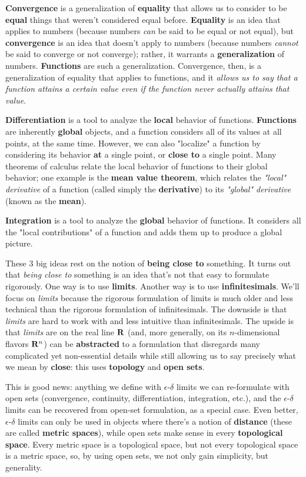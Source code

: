 {\bf Convergence} is a generalization of {\bf equality} that allows us to consider to be {\bf equal} things that weren't considered equal before. {\bf Equality} is an idea that applies to numbers (because numbers {\it can} be said to be equal or not equal), but {\bf convergence} is an idea that doesn't apply to numbers (because numbers {\it cannot} be said to converge or not converge); rather, it warrants a {\bf generalization} of numbers. {\bf Functions} are such a generalization. Convergence, then, is a generalization of equality that applies to functions, and it {\it allows us to say that a function attains a certain value even if the function never actually attains that value}.

{\bf Differentiation} is a tool to analyze the {\bf local} behavior of functions. {\bf Functions} are inherently {\bf global} objects, and a function considers all of its values at all points, at the same time. However, we can also "localize" a function by considering its behavior {\bf at} a single point, or {\bf close to} a single point. Many theorems of calculus relate the local behavior of functions to their global behavior; one example is the {\bf mean value theorem}, which relates the {\it"local" derivative} of a function (called simply the {\bf derivative}) to its {\it"global" derivative} (known as the {\bf mean}).

{\bf Integration} is a tool to analyze the {\bf global} behavior of functions. It considers all the "local contributions" of a function and adds them up to produce a global picture.

These 3 big ideas rest on the notion of {\bf being close to} something. It turns out that {\it being close to} something is an idea that's not that easy to formulate rigorously. One way is to use {\bf limits}. Another way is to use {\bf infinitesimals}. We'll focus on {\it limits} because the rigorous formulation of limits is much older and less technical than the rigorous formulation of infinitesimals. The downside is that {\it limits} are hard to work with and less intuitive than infinitesimals. The upside is that {\it limits} are on the real line ${\bf R}$ (and, more generally, on its $n$-dimensional flavors ${\bf R}^n$) can be {\bf abstracted} to a formulation that disregards many complicated yet non-essential details while still allowing us to say precisely what we mean by {\bf close}: this uses {\bf topology} and {\bf open sets}.

This is good news: anything we define with $\epsilon$-$\delta$ limits we can re-formulate with open sets (convergence, continuity, differentiation, integration, etc.), and the $\epsilon$-$\delta$ limits can be recovered from open-set formulation, as a special case. Even better, $\epsilon$-$\delta$ limits can only be used in objects where there's a notion of {\bf distance} (these are called {\bf metric spaces}), while open sets make sense in every {\bf topological space}. Every metric space is a topological space, but not every topological space is a metric space, so, by using open sets, we not only gain simplicity, but generality.

